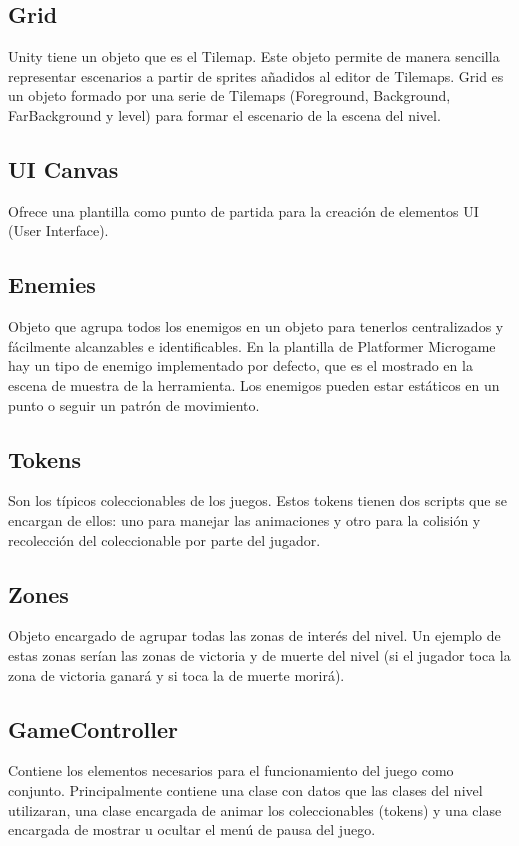 \subsection{Grid}
Unity tiene un objeto que es el Tilemap. Este objeto permite de manera sencilla representar escenarios a partir de sprites añadidos al editor de Tilemaps. Grid es un objeto formado por una serie de Tilemaps (Foreground, Background, FarBackground y level) para formar el escenario de la escena del nivel.

\subsection{UI Canvas}
Ofrece una plantilla como punto de partida para la creación de elementos UI (User Interface).

\subsection{Enemies}
Objeto que agrupa todos los enemigos en un objeto para tenerlos centralizados y fácilmente alcanzables e identificables. En la plantilla de Platformer Microgame hay un tipo de enemigo implementado por defecto, que es el mostrado en la escena de muestra de la herramienta. Los enemigos pueden estar estáticos en un punto o seguir un patrón de movimiento.

\subsection{Tokens}
Son los típicos coleccionables de los juegos. Estos tokens tienen dos scripts que se encargan de ellos: uno para manejar las animaciones y otro para la colisión y recolección del coleccionable por parte del jugador.

\subsection{Zones}
Objeto encargado de agrupar todas las zonas de interés del nivel. Un ejemplo de estas zonas serían las zonas de victoria y de muerte del nivel (si el jugador toca la zona de victoria ganará y si toca la de muerte morirá).

\subsection{GameController}
Contiene los elementos necesarios para el funcionamiento del juego como conjunto. Principalmente contiene una clase con datos que las clases del nivel utilizaran, una clase encargada de animar los coleccionables (tokens) y una clase encargada de mostrar u ocultar el menú de pausa del juego.

